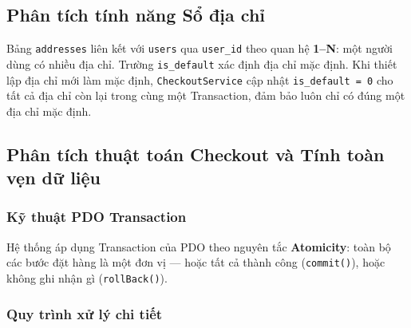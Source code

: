 \documentclass[11pt, a4paper]{article}
\begin{document}
\subsection{Phân tích tính năng Sổ địa chỉ}

Bảng \texttt{addresses} liên kết với \texttt{users} qua \texttt{user\_id} theo quan hệ \textbf{1--N}: một người dùng có nhiều địa chỉ. Trường \texttt{is\_default} xác định địa chỉ mặc định. Khi thiết lập địa chỉ mới làm mặc định, \texttt{CheckoutService} cập nhật \texttt{is\_default = 0} cho tất cả địa chỉ còn lại trong cùng một Transaction, đảm bảo luôn chỉ có đúng một địa chỉ mặc định.

\subsection{Phân tích thuật toán Checkout và Tính toàn vẹn dữ liệu}

\subsubsection{Kỹ thuật PDO Transaction}

Hệ thống áp dụng Transaction của PDO theo nguyên tắc \textbf{Atomicity}: toàn bộ các bước đặt hàng là một đơn vị --- hoặc tất cả thành công (\texttt{commit()}), hoặc không ghi nhận gì (\texttt{rollBack()}).

\subsubsection{Quy trình xử lý chi tiết}
\end{document}
